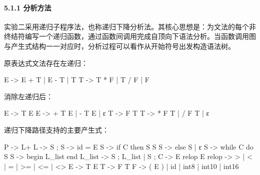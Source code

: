 \documentclass[
  a4paper,
  fontset=none,
]{ctexart}
\newenvironment{Shaded}{}{}
\newcommand{\NormalTok}[1]{#1}
\begin{document}
\hypertarget{ux5206ux6790ux65b9ux6cd5}{%
\paragraph{5.1.1 分析方法}\label{ux5206ux6790ux65b9ux6cd5}}

实验二采用递归子程序法，也称递归下降分析法。其核心思想是：为文法的每个非终结符编写一个递归函数，通过函数间调用完成自顶向下语法分析。当函数调用图与产生式结构一一对应时，分析过程可以看作从开始符号出发构造语法树。

原表达式文法存在左递归：

\begin{Shaded}
\begin{Highlighting}[]
\NormalTok{E {-}\textgreater{} E + T | E {-} T | T}
\NormalTok{T {-}\textgreater{} T * F | T / F | F}
\end{Highlighting}
\end{Shaded}

消除左递归后：

\begin{Shaded}
\begin{Highlighting}[]
\NormalTok{E  {-}\textgreater{} T E\textquotesingle{}}
\NormalTok{E\textquotesingle{} {-}\textgreater{} + T E\textquotesingle{} | {-} T E\textquotesingle{} | ε}
\NormalTok{T  {-}\textgreater{} F T\textquotesingle{}}
\NormalTok{T\textquotesingle{} {-}\textgreater{} * F T\textquotesingle{} | / F T\textquotesingle{} | ε}
\end{Highlighting}
\end{Shaded}

递归下降路径支持的主要产生式：

\begin{Shaded}
\begin{Highlighting}[]
\NormalTok{P      {-}\textgreater{} L+}
\NormalTok{L      {-}\textgreater{} S ;}
\NormalTok{S      {-}\textgreater{} id = E}
\NormalTok{S      {-}\textgreater{} if C then S S\textquotesingle{}}
\NormalTok{S\textquotesingle{}     {-}\textgreater{} else S | ε}
\NormalTok{S      {-}\textgreater{} while C do S}
\NormalTok{S      {-}\textgreater{} begin L\_list end}
\NormalTok{L\_list {-}\textgreater{} S ; L\_list | S ;}
\NormalTok{C      {-}\textgreater{} E relop E}
\NormalTok{relop  {-}\textgreater{} \textgreater{} | \textless{} | = | \textgreater{}= | \textless{}= | \textless{}\textgreater{}}
\NormalTok{E      {-}\textgreater{} T E\textquotesingle{}}
\NormalTok{T      {-}\textgreater{} F T\textquotesingle{}}
\NormalTok{F      {-}\textgreater{} ( E ) | id | int8 | int10 | int16}
\end{Highlighting}
\end{Shaded}
\end{document}
